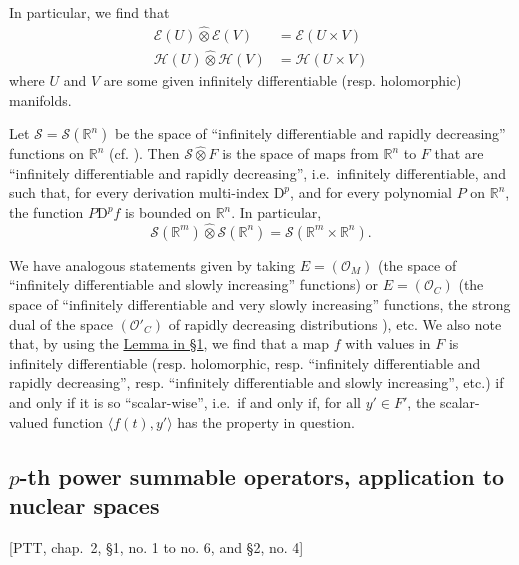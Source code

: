 \documentclass[british]{article}
\newcommand{\oldpage}[1]{\marginpar{\footnotesize$\Big\vert$ \textit{p.~#1}}}
\begin{document}
In particular, we find that \[
  \begin{aligned}
    \mathscr{E}(U)\hat{\otimes}\mathscr{E}(V) &= \mathscr{E}(U\times V)
  \\\mathscr{H}(U)\hat{\otimes}\mathscr{H}(V) &= \mathscr{H}(U\times V)
  \end{aligned}
\] where \(U\) and \(V\) are some given infinitely differentiable (resp.
holomorphic) manifolds.

Let \(\mathscr{S}=\mathscr{S}(\mathbb{R}^n)\) be the space of
``infinitely differentiable and rapidly decreasing'' functions on
\(\mathbb{R}^n\) (cf. \autocite[t. 2]{9}). Then
\(\mathscr{S}\hat{\otimes}F\) is the space of maps from \(\mathbb{R}^n\)
to \(F\) that are ``infinitely differentiable and rapidly decreasing'',
i.e.~infinitely differentiable, and such that, for every derivation
multi-index \(\mathrm{D}^p\), and for every polynomial \(P\) on
\(\mathbb{R}^n\), the function \(P\mathrm{D}^pf\) is bounded on
\(\mathbb{R}^n\). In particular, \[
  \mathscr{S}(\mathbb{R}^m)\hat{\otimes}\mathscr{S}(\mathbb{R}^n) = \mathscr{S}(\mathbb{R}^m\times\mathbb{R}^n).
\]

We have analogous statements given by taking \(E=(\mathscr{O}_M)\) (the
space of ``infinitely differentiable and slowly increasing'' functions)
or \(E=(\mathscr{O}_C)\) (the space of ``infinitely differentiable and
very slowly increasing'' functions, the strong dual of the space
\((\mathscr{O}'_C)\) of rapidly decreasing distributions \autocite{9}),
etc. \oldpage{106} We also note that, by using the
\hyperref[section-1-lemma]{Lemma in §1}, we find that a map \(f\) with
values in \(F\) is infinitely differentiable (resp. holomorphic, resp.
``infinitely differentiable and rapidly decreasing'', resp. ``infinitely
differentiable and slowly increasing'', etc.) if and only if it is so
``scalar-wise'', i.e.~if and only if, for all \(y'\in F'\), the
scalar-valued function \(\langle f(t),y'\rangle\) has the property in
question.

\subsection{\texorpdfstring{\(p\)-th power summable operators,
application to nuclear
spaces}{p-th power summable operators, application to nuclear spaces}}\label{section-2.6}

{[}PTT, chap.~2, §1, no. 1 to no. 6, and §2, no. 4{]}
\end{document}
